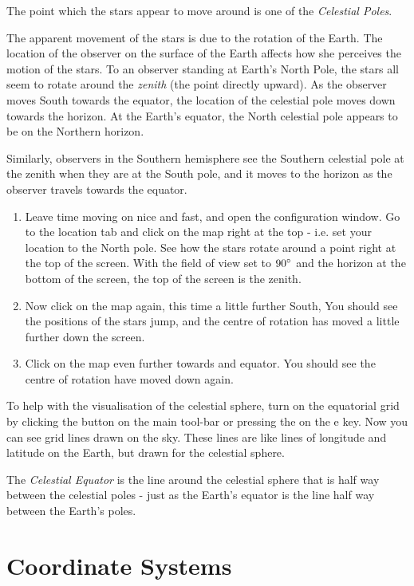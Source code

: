 The point which the stars appear to move around is one of the
\emph{Celestial Poles}.

The apparent movement of the stars is due to the rotation of the Earth.
The location of the observer on the surface of the Earth affects how she
perceives the motion of the stars. To an observer standing at Earth's
North Pole, the stars all seem to rotate around the \emph{zenith} (the
point directly upward). As the observer moves South towards the equator,
the location of the celestial pole moves down towards the horizon. At
the Earth's equator, the North celestial pole appears to be on the
Northern horizon.

Similarly, observers in the Southern hemisphere see the Southern
celestial pole at the zenith when they are at the South pole, and it
moves to the horizon as the observer travels towards the equator.

\begin{enumerate}
\item
  Leave time moving on nice and fast, and open the configuration window.
  Go to the location tab and click on the map right at the top - i.e.
  set your location to the North pole. See how the stars rotate around a
  point right at the top of the screen. With the field of view set to
  $90\degree$ and the horizon at the bottom of the screen, the top of the screen
  is the zenith.
\item
  Now click on the map again, this time a little further South, You
  should see the positions of the stars jump, and the centre of rotation
  has moved a little further down the screen.
\item
  Click on the map even further towards and equator. You should see the
  centre of rotation have moved down again.
\end{enumerate}

To help with the visualisation of the celestial sphere, turn on the
equatorial grid by clicking the button on the main tool-bar or pressing
the on the e key. Now you can see grid lines drawn on the sky. These
lines are like lines of longitude and latitude on the Earth, but drawn
for the celestial sphere.

The \emph{Celestial Equator} is the line around the celestial sphere
that is half way between the celestial poles - just as the Earth's
equator is the line half way between the Earth's poles.

\section{Coordinate Systems}\label{coordinate-systems}

